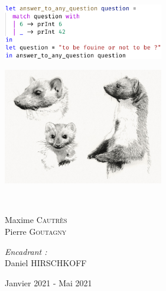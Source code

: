\documentclass[14pt,a4paper]{extarticle}
\begin{document}
\begin{titlepage}
\begin{sffamily}
\begin{center}
            \begin{minipage}[c]{.46\linewidth}
                \centering
                \includegraphics[width=7cm]{fouine short example.png}
            \end{minipage}
            \hfill%
            \begin{minipage}[c]{.46\linewidth}
                \centering
                \includegraphics[width=7cm]{20_martes-foina.jpg}
            \end{minipage}\\[3cm]
            \hspace{-0.8cm}
            \begin{minipage}{0.4\textwidth}
                \begin{flushleft} \large
                    Maxime \textsc{Cautrès}\\
                    Pierre \textsc{Goutagny}\\
                \end{flushleft}
            \end{minipage}
            \hspace{3cm}
            \begin{minipage}{0.4\textwidth}
                \begin{flushright} \large
                    \emph{Encadrant :} \\
                    Daniel \textsc{HIRSCHKOFF}\\
                \end{flushright}
            \end{minipage}

            \vfill

            {\large  Janvier 2021 - Mai 2021}
        \end{center}
    \end{sffamily}
\end{titlepage}
\end{document}
